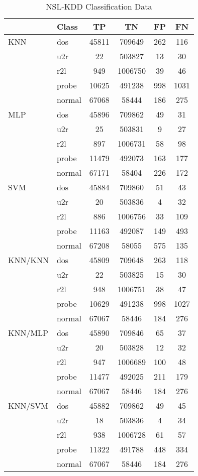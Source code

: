 \begin{longtable}{@{}llcccc@{}}
\caption{NSL-KDD Classification Data} \\
\toprule
 & Class & TP & TN & FP & FN \\ \midrule
KNN & dos & 45811 & 709649 & 262 & 116 \\
 & u2r & 22 & 503827 & 13 & 30 \\
 & r2l & 949 & 1006750 & 39 & 46 \\
 & probe & 10625 & 491238 & 998 & 1031 \\
 & normal & 67068 & 58444 & 186 & 275 \\
MLP & dos & 45896 & 709862 & 49 & 31 \\
 & u2r & 25 & 503831 & 9 & 27 \\
 & r2l & 897 & 1006731 & 58 & 98 \\
 & probe & 11479 & 492073 & 163 & 177 \\
 & normal & 67171 & 58404 & 226 & 172 \\
SVM & dos & 45884 & 709860 & 51 & 43 \\
 & u2r & 20 & 503836 & 4 & 32 \\
 & r2l & 886 & 1006756 & 33 & 109 \\
 & probe & 11163 & 492087 & 149 & 493 \\
 & normal & 67208 & 58055 & 575 & 135 \\
KNN/KNN & dos & 45809 & 709648 & 263 & 118 \\
 & u2r & 22 & 503825 & 15 & 30 \\
 & r2l & 948 & 1006751 & 38 & 47 \\
 & probe & 10629 & 491238 & 998 & 1027 \\
 & normal & 67067 & 58446 & 184 & 276 \\
KNN/MLP & dos & 45890 & 709846 & 65 & 37 \\
 & u2r & 20 & 503828 & 12 & 32 \\
 & r2l & 947 & 1006689 & 100 & 48 \\
 & probe & 11477 & 492025 & 211 & 179 \\
 & normal & 67067 & 58446 & 184 & 276 \\
KNN/SVM & dos & 45882 & 709862 & 49 & 45 \\
 & u2r & 18 & 503836 & 4 & 34 \\
 & r2l & 938 & 1006728 & 61 & 57 \\
 & probe & 11322 & 491788 & 448 & 334 \\
 & normal & 67067 & 58446 & 184 & 276 \\

\end{longtable}
